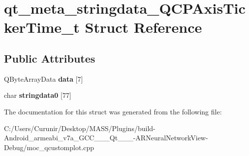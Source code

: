 \hypertarget{structqt__meta__stringdata___q_c_p_axis_ticker_time__t}{}\section{qt\+\_\+meta\+\_\+stringdata\+\_\+\+Q\+C\+P\+Axis\+Ticker\+Time\+\_\+t Struct Reference}
\label{structqt__meta__stringdata___q_c_p_axis_ticker_time__t}
\subsection*{Public Attributes}
\begin{DoxyCompactItemize}
\item 
\mbox{\label{structqt__meta__stringdata___q_c_p_axis_ticker_time__t_a098e84302f844cd1ebdaff00e9c2a0fd}} 
Q\+Byte\+Array\+Data {\bfseries data} \mbox{[}7\mbox{]}
\item 
\mbox{\label{structqt__meta__stringdata___q_c_p_axis_ticker_time__t_a270cfdd3a27741596d226e3beb2871a0}} 
char {\bfseries stringdata0} \mbox{[}77\mbox{]}
\end{DoxyCompactItemize}


The documentation for this struct was generated from the following file\+:\begin{DoxyCompactItemize}
\item 
C\+:/\+Users/\+Curunir/\+Desktop/\+M\+A\+S\+S/\+Plugins/build-\/\+Android\+\_\+armeabi\+\_\+v7a\+\_\+\+G\+C\+C\+\_\+\_\+\_\+\+Qt\+\_\+\_\+\_-\/\+A\+R\+Neural\+Network\+View-\/\+Debug/moc\+\_\+qcustomplot.\+cpp\end{DoxyCompactItemize}
